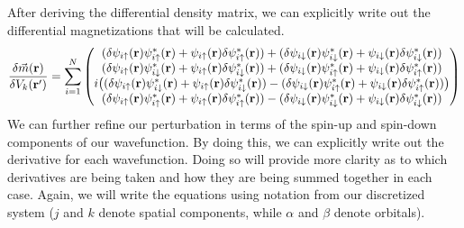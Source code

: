 \documentclass[10pt]{revtex4-1}
\newcommand{\bfr}{{\bf r}}
\newcommand{\ua}{\uparrow}
\newcommand{\da}{\downarrow}
\begin{document}
After deriving the differential density matrix, we can explicitly write out the differential magnetizations that will be calculated.
\begin{equation}
  \frac{\delta \vec{m}(\bfr)}{\delta V_k(\bfr')} = \sum_{i=1}^N
  \begin{pmatrix}
    (\delta \psi_{i \ua}(\bfr) \psi_{i \ua}^*(\bfr) + \psi_{i \ua}(\bfr) \delta \psi_{i \ua}^*(\bfr)) + (\delta \psi_{i \da}(\bfr) \psi_{i \da}^*(\bfr) + \psi_{i \da}(\bfr) \delta \psi_{i \da}^*(\bfr)) \\
    (\delta \psi_{i \ua}(\bfr) \psi_{i \da}^*(\bfr) + \psi_{i \ua}(\bfr) \delta \psi_{i \da}^*(\bfr)) + (\delta \psi_{i \da}(\bfr) \psi_{i \ua}^*(\bfr) + \psi_{i \da}(\bfr) \delta \psi_{i \ua}^*(\bfr)) \\
    i\big((\delta \psi_{i \ua}(\bfr) \psi_{i \da}^*(\bfr) + \psi_{i \ua}(\bfr) \delta \psi_{i \da}^*(\bfr)) - (\delta \psi_{i \da}(\bfr) \psi_{i \ua}^*(\bfr) + \psi_{i \da}(\bfr) \delta \psi_{i \ua}^*(\bfr))\big) \\
    (\delta \psi_{i \ua}(\bfr) \psi_{i \ua}^*(\bfr) + \psi_{i \ua}(\bfr) \delta \psi_{i \ua}^*(\bfr)) - (\delta \psi_{i \da}(\bfr) \psi_{i \da}^*(\bfr) + \psi_{i \da}(\bfr) \delta \psi_{i \da}^*(\bfr)) \\
  \end{pmatrix}
\end{equation}
We can further refine our perturbation in terms of the spin-up and spin-down components of our wavefunction.
By doing this, we can explicitly write out the derivative for each wavefunction.
Doing so will provide more clarity as to which derivatives are being taken and how they are being summed together in each case.
Again, we will write the equations using notation from our discretized system ($j$ and $k$ denote spatial components, while $\alpha$ and $\beta$ denote orbitals).
\end{document}
